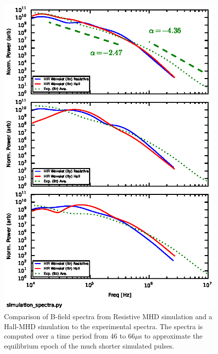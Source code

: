 \documentclass[12pt]{iopart}
\begin{document}
\begin{figure}[!htbp]
\centerline{
\includegraphics[width=12cm]{simBspectra.eps}}
\caption{\label{fig:simBspectra} Comparison of B-field spectra from Resistive MHD simulation and a Hall-MHD simulation to the experimental spectra. The spectra is computed over a time period from 46 to 66$\mu$s to approximate the equilibrium epoch of the much shorter simulated pulses.}
\end{figure}
\end{document}
